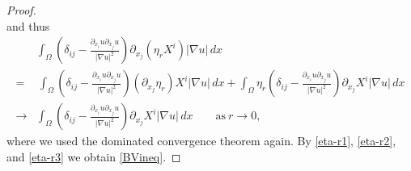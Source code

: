 \documentclass{amsart}
\theoremstyle{definition}
\begin{document}
\begin{proof}
\begin{equation*}
\end{equation*}
and thus
\begin{equation}\label{eta-r3}
\begin{split}
&\int_{\Omega} \left( \delta_{ij} - \frac{ \partial_{x_i} u \partial _{x_j} u }{|\nabla u|^2} \right)
\partial_{x_j} (\eta_r X ^i) |\nabla u| \, dx \\
= & \, 
\int_{\Omega} \left( \delta_{ij} - \frac{ \partial_{x_i} u \partial _{x_j} u }{|\nabla u|^2} \right)
(\partial_{x_j} \eta_r) X ^i |\nabla u| \, dx
+
\int_{\Omega} \eta_r 
\left( \delta_{ij} - \frac{ \partial_{x_i} u \partial _{x_j} u }{|\nabla u|^2} \right)
\partial_{x_j} X ^i |\nabla u| \, dx \\
\to & 
\int_{\Omega} \left( \delta_{ij} - \frac{ \partial_{x_i} u \partial _{x_j} u }{|\nabla u|^2} \right)
\partial_{x_j} X ^i |\nabla u| \, dx \qquad \text{as} \ r\to 0,
\end{split}
\end{equation}
where we used the dominated convergence theorem again.
By \eqref{eta-r1}, \eqref{eta-r2}, and \eqref{eta-r3} we obtain \eqref{BVineq}.
\end{proof}
\end{document}
